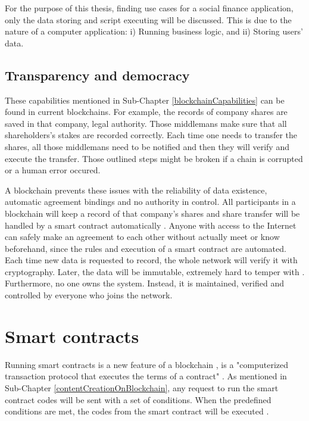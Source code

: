 \documentclass[twoside,numperchapter]{tutthesis} %
\begin{document}
For the purpose of this thesis, finding use cases for a social finance application, only the data storing and script executing will be discussed. This is due to the nature of a computer application: i) Running business logic, and ii) Storing users' data.

\subsection{Transparency and democracy}

These capabilities mentioned in Sub-Chapter \ref{blockchainCapabilities} can be found in current blockchains. For example, the records of company shares are saved in that company, legal authority. Those middlemans make sure that all shareholders's stakes are recorded correctly. Each time one needs to transfer the shares, all those middlemans need to be notified and then they will verify and execute the transfer. Those outlined steps might be broken if a chain is corrupted or a human error occured.

A blockchain prevents these issues with the reliability of data existence, automatic agreement bindings and no authority in control. All participants in a blockchain will keep a record of that company's shares and share transfer will be handled by a smart contract automatically \citep{RefWorks:doc:BlockchainProtocolInClinicalTrials}. Anyone with access to the Internet can safely make an agreement to each other without actually meet or know beforehand, since the rules and execution of a smart contract are automated.  Each time new data is requested to record, the whole network will verify it with cryptography. Later, the data will be immutable, extremely hard to temper with \citep{RefWorks:doc:BitcoinWhitepaper}\citep{RefWorks:doc:EthereumWhitepaper}. Furthermore, no one owns the system. Instead, it is maintained, verified and controlled by everyone who joins the network.

\section{Smart contracts}

Running smart contracts is a new feature of a blockchain \citep{RefWorks:doc:BlockchainInSustainableEnergySystem}, is a "computerized transaction protocol that executes the terms of a
contract" \citep{SmartContracts}. As mentioned in Sub-Chapter \ref{contentCreationOnBlockchain}, any request to run the smart contract codes will be sent with a set of conditions. When the predefined conditions are met, the codes from the smart contract will be executed \citep{RefWorks:doc:MasteringBlockchain}.
\end{document}
